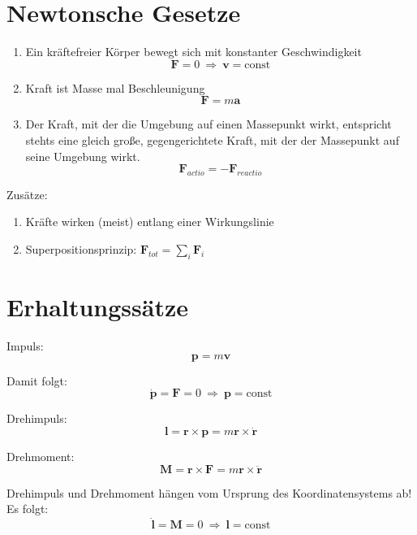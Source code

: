 \begin{frameddefn}[Koordinatendarstellungen]
\end{frameddefn}



\section{Newtonsche Gesetze}

\begin{framedthm}
	\begin{enumerate}
		\item Ein kräftefreier Körper bewegt sich mit konstanter Geschwindigkeit \[\mathbf{F} = 0 \ \Rightarrow\  \mathbf{v} = \textrm{const}\]
		\item Kraft ist Masse mal Beschleunigung \[\mathbf{F} = m \mathbf{a}\]
		\item Der Kraft, mit der die Umgebung auf einen Massepunkt wirkt, entspricht stehts eine gleich große, gegengerichtete Kraft, mit der der Massepunkt auf seine Umgebung wirkt. \[\mathbf{F}_{actio} = -\mathbf{F}_{reactio}\]
	\end{enumerate}
	
	Zusätze:
	\begin{enumerate}
		\item Kräfte wirken (meist) entlang einer Wirkungslinie
		\item Superpositionsprinzip: $\mathbf{F}_{tot} = \sum_i \mathbf{F}_i$
	\end{enumerate}
\end{framedthm}


\section{Erhaltungssätze}

\begin{framedthm}[Impulserhaltung]
	Impuls: \[\mathbf{p} = m \mathbf{v}\]
	
	Damit folgt: \[\mathbf{\dot{p}} = \mathbf{F} = 0 \ \Rightarrow\ \mathbf{p} = \textrm{const}\]
	
\end{framedthm}

\begin{framedthm}[Drehimpulserhaltung]
	Drehimpuls:
	\[ \mathbf{l} = \mathbf{r} \times \mathbf{p} = m \mathbf{r} \times \mathbf{\dot{r}}\]
	
	Drehmoment:
	\[ \mathbf{M} = \mathbf{r} \times \mathbf{F} = m \mathbf{r} \times \mathbf{\ddot{r}} \]
	
	Drehimpuls und Drehmoment hängen vom Ursprung des Koordinatensystems ab!
	Es folgt:
	\[ \mathbf{\dot{l}} = \mathbf{M} = 0 \ \Rightarrow \ \mathbf{l} = \textrm{const} \]
\end{framedthm}

